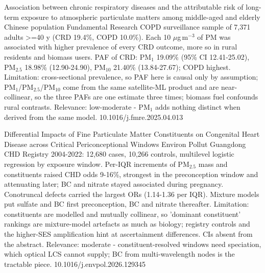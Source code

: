 \documentclass[10pt]{article}
\begin{document}
{Association between chronic respiratory diseases and the attributable risk of long-term exposure to atmospheric particulate matters among middle-aged and elderly Chinese population}
{Fundamental Research}
{COPD surveillance sample of 7,371 adults >=40 y (CRD 19.4\%, COPD 10.0\%). Each 10 $\mu$g\,m$^{-3}$ of PM was associated with higher prevalence of every CRD outcome, more so in rural residents and biomass users. PAF of CRD: PM$_{1}$ 19.09\% (95\% CI 12.41-25.02), PM$_{2.5}$ 18.98\% (12.90-24.90), PM$_{10}$ 21.40\% (13.84-27.67); COPD highest. Limitation: cross-sectional prevalence, so PAF here is causal only by assumption; PM$_{1}$/PM$_{2.5}$/PM$_{10}$ come from the same satellite-ML product and are near-collinear, so the three PAFs are one estimate three times; biomass fuel confounds rural contrasts. Relevance: low-moderate - PM$_{1}$ adds nothing distinct when derived from the same model.}
{10.1016/j.fmre.2025.04.013}

\par{}\baselineskip{}\baselineskip
{}

{Differential Impacts of Fine Particulate Matter Constituents on Congenital Heart Disease across Critical Periconceptional Windows}
{Environ Pollut}
{Guangdong CHD Registry 2004-2022: 12,680 cases, 10,266 controls, multilevel logistic regression by exposure window. Per-IQR increments of PM$_{2.5}$ mass and constituents raised CHD odds 9-16\%, strongest in the preconception window and attenuating later; BC and nitrate stayed associated during pregnancy. Conotruncal defects carried the largest ORs (1.14-1.36 per IQR). Mixture models put sulfate and BC first preconception, BC and nitrate thereafter. Limitation: constituents are modelled and mutually collinear, so 'dominant constituent' rankings are mixture-model artefacts as much as biology; registry controls and the higher-SES amplification hint at ascertainment differences. CIs absent from the abstract. Relevance: moderate - constituent-resolved windows need speciation, which optical LCS cannot supply; BC from multi-wavelength nodes is the tractable piece.}
{10.1016/j.envpol.2026.129345}

\par{}\baselineskip{}\baselineskip
{}
\end{document}
